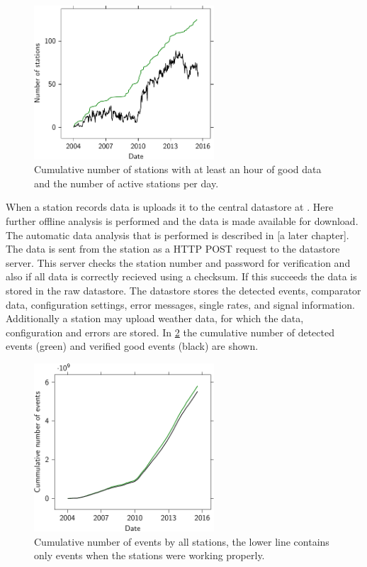 \begin{figure}
    \centering
    \includegraphics[width=0.6\textwidth]
                    {plots/cluster/active_stations}
    \caption{Cumulative number of stations with at least an hour of good data and the number of active stations per day.}
    \label{fig:active_stations}
\end{figure}


When a station records data is uploads it to the central datastore at \nikhef. Here further offline analysis is performed and the data is made available for download. The automatic data analysis that is performed is described in [a later chapter]. The data is sent from the station as a HTTP POST request to the datastore server. This server checks the station number and password for verification and also if all data is correctly recieved using a checksum. If this succeeds the data is stored in the raw datastore. The datastore stores the detected events, comparator data, configuration settings, error messages, single rates, and \gps signal information. Additionally a station may upload weather data, for which the data, configuration and errors are stored. In \cref{fig:luminosity_network} the cumulative number of detected events (green) and verified good events (black) are shown.

\begin{figure}
    \centering
    \includegraphics[width=0.6\textwidth]
                    {plots/cluster/luminosity_network}
    \caption{Cumulative number of events by all stations, the lower line contains only events when the stations were working properly.}
    \label{fig:luminosity_network}
\end{figure}

